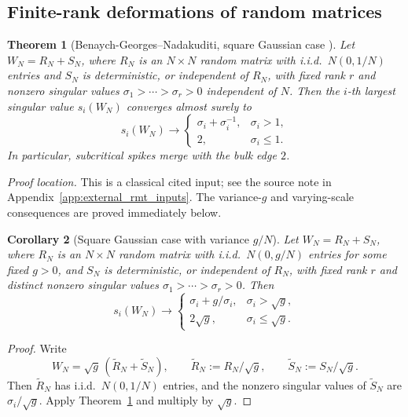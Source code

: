 \documentclass[11pt]{article}
\theoremstyle{plain}
\newtheorem{thm}{Theorem}[section]
\newtheorem{cor}[thm]{Corollary}
\theoremstyle{definition}
\theoremstyle{remark}
\newcommand{\1}{\mathbf{1}}
\newcommand{\proofloc}[1]{\par\noindent\emph{Proof location.} #1\par}
\begin{document}
\subsection{Finite-rank deformations of random matrices}

\begin{thm}[Benaych-Georges--Nadakuditi, square Gaussian case \cite{benaych2012singular}]
\label{thm:BGN_square}
Let \(W_N=R_N+S_N\), where \(R_N\) is an \(N\times N\) random matrix with i.i.d.\ \(N(0,1/N)\) entries and \(S_N\) is deterministic, or independent of \(R_N\), with fixed rank \(r\) and nonzero singular values \(\sigma_1>\cdots>\sigma_r>0\) independent of \(N\). Then the \(i\)-th largest singular value \(s_i(W_N)\) converges almost surely to
\[
s_i(W_N)\to
\begin{cases}
\sigma_i+\sigma_i^{-1}, & \sigma_i>1,\\[0.2em]
2, & \sigma_i\le 1.
\end{cases}
\]
In particular, subcritical spikes merge with the bulk edge \(2\).
\end{thm}
\proofloc{This is a classical cited input; see the source note in Appendix~\ref{app:external_rmt_inputs}. The variance-\(g\) and varying-scale consequences are proved immediately below.}

\begin{cor}[Square Gaussian case with variance \(g/N\)]
\label{cor:BGN_square_g}
Let \(W_N=R_N+S_N\), where \(R_N\) is an \(N\times N\) random matrix with i.i.d.\ \(N(0,g/N)\) entries for some fixed \(g>0\), and \(S_N\) is deterministic, or independent of \(R_N\), with fixed rank \(r\) and distinct nonzero singular values \(\sigma_1>\cdots>\sigma_r>0\). Then
\[
s_i(W_N)\to
\begin{cases}
\sigma_i+g/\sigma_i, & \sigma_i>\sqrt g,\\[0.2em]
2\sqrt g, & \sigma_i\le \sqrt g.
\end{cases}
\]
\end{cor}

\begin{proof}
Write
\[
W_N=\sqrt g\,(\widetilde R_N+\widetilde S_N),
\qquad
\widetilde R_N:=R_N/\sqrt g,
\qquad
\widetilde S_N:=S_N/\sqrt g.
\]
Then \(\widetilde R_N\) has i.i.d.\ \(N(0,1/N)\) entries, and the nonzero singular values of \(\widetilde S_N\) are \(\sigma_i/\sqrt g\). Apply Theorem~\ref{thm:BGN_square} and multiply by \(\sqrt g\).
\end{proof}
\end{document}
